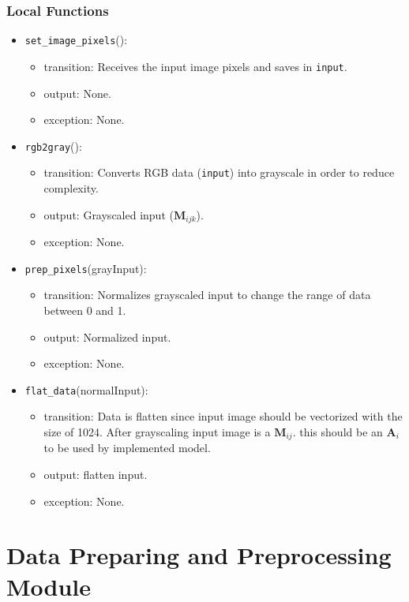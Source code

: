 \documentclass[12pt, titlepage]{article}
\def\code#1{\texttt{#1}}
\begin{document}
\subsubsection{Local Functions}
\begin{itemize}
  \item \code{set\_image\_pixels}():
  \begin{itemize}
    \item transition: Receives the input image pixels and saves in \code{input}.
    \item output: None.
    \item exception: None.
  \end{itemize}

  \item \code{rgb2gray}():
  \begin{itemize}
    \item transition: Converts RGB data (\code{input}) into grayscale in order to reduce complexity. 
    \item output: Grayscaled input ($\mathbf{M}_{ijk}$).
    \item exception: None.
  \end{itemize}
  \item \code{prep\_pixels}(grayInput):
  \begin{itemize}
    \item transition: Normalizes grayscaled input to change the range of data between 0 and 1.
    \item output: Normalized input.
    \item exception: None.
  \end{itemize}
  \item \code{flat\_data}(normalInput):
  \begin{itemize}
    \item transition: Data is flatten since input image should be vectorized with the size of 1024. 
    After grayscaling input image is a $\mathbf{M}_{ij}$. this should be an $\mathbf{A}_{i}$ to be used by implemented model.
    \item output: flatten input.
    \item exception: None.
  \end{itemize}

\end{itemize}

\newpage

\section{Data Preparing and Preprocessing Module} \label{Data} 
\end{document}
